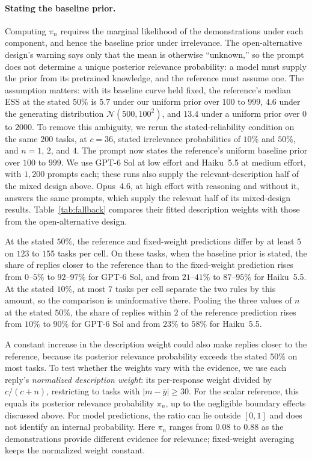 \documentclass{article}
\theoremstyle{definition}
\begin{document}
\paragraph{Stating the baseline prior.}
Computing $\pi_n$ requires the marginal likelihood of the demonstrations under each component, and hence the baseline prior under irrelevance. The open-alternative design's warning says only that the mean is otherwise ``unknown,'' so the prompt does not determine a unique posterior relevance probability: a model must supply the prior from its pretrained knowledge, and the reference must assume one. The assumption matters: with its baseline curve held fixed, the reference's median ESS at the stated $50\%$ is $5.7$ under our uniform prior over $100$ to $999$, $4.6$ under the generating distribution $\mathcal{N}(500,100^2)$, and $13.4$ under a uniform prior over $0$ to $2000$. To remove this ambiguity, we rerun the stated-reliability condition on the same $200$ tasks, at $c=36$, stated irrelevance probabilities of $10\%$ and $50\%$, and $n=1$, $2$, and $4$. The prompt now states the reference's uniform baseline prior over $100$ to $999$. We use GPT-6 Sol at low effort and Haiku~5.5 at medium effort, with $1{,}200$ prompts each; these runs also supply the relevant-description half of the mixed design above. Opus~4.6, at high effort with reasoning and without it, answers the same prompts, which supply the relevant half of its mixed-design results. Table~\ref{tab:fallback} compares their fitted description weights with those from the open-alternative design.

At the stated $50\%$, the reference and fixed-weight predictions differ by at least $5$ on $123$ to $155$ tasks per cell. On these tasks, when the baseline prior is stated, the share of replies closer to the reference than to the fixed-weight prediction rises from $0$--$5\%$ to $92$--$97\%$ for GPT-6 Sol, and from $21$--$41\%$ to $87$--$95\%$ for Haiku~5.5. At the stated $10\%$, at most $7$ tasks per cell separate the two rules by this amount, so the comparison is uninformative there. Pooling the three values of $n$ at the stated $50\%$, the share of replies within $2$ of the reference prediction rises from $10\%$ to $90\%$ for GPT-6 Sol and from $23\%$ to $58\%$ for Haiku~5.5.

A constant increase in the description weight could also make replies closer to the reference, because its posterior relevance probability exceeds the stated $50\%$ on most tasks. To test whether the weights vary with the evidence, we use each reply's \emph{normalized description weight}: its per-response weight divided by $c/(c+n)$, restricting to tasks with $|m-\bar y|\geq30$. For the scalar reference, this equals its posterior relevance probability $\pi_n$, up to the negligible boundary effects discussed above. For model predictions, the ratio can lie outside $[0,1]$ and does not identify an internal probability. Here $\pi_n$ ranges from $0.08$ to $0.88$ as the demonstrations provide different evidence for relevance; fixed-weight averaging keeps the normalized weight constant.
\end{document}

